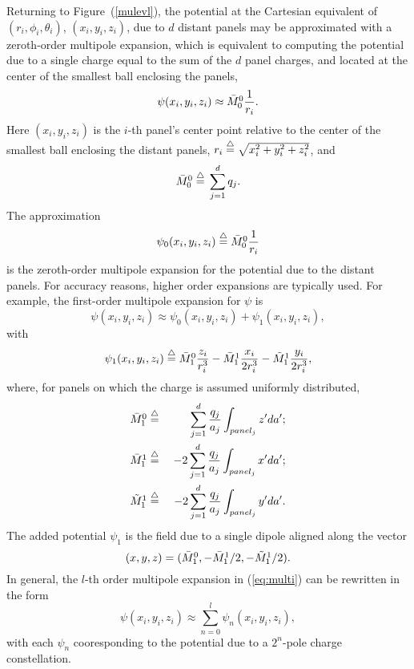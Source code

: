 Returning to Figure~(\ref{mulevl}), the potential at the Cartesian
equivalent of $(r_i,\phi_i,\theta_i)$, $(x_i, y_i, z_i)$, due to $d$
distant panels may be approximated with a zeroth-order multipole
expansion, which is equivalent to computing the potential due to a
single charge equal to the sum of the $ d $ panel charges, and located
at the center of the smallest ball enclosing the panels,
\begin{equation}
\psi(x_i,y_i,z_i)\approx\mbox{$\bar{M}_{0}^{0}$}\frac{1}{r_i}.
\label{mulex0}
\end{equation}
Here $(x_i,y_i,z_i)$ is the $i$-th panel's center point relative to the
center of the smallest ball enclosing the distant panels, 
$r_i\mbox{$\;\stackrel{\triangle}{=}\;$}\sqrt{x_i^2+y_i^2+z_i^2}$, and
\begin{equation}
\mbox{$\bar{M}_{0}^{0}$}\mbox{$\;\stackrel{\triangle}{=}\;$} \sum_{j=1}^{d} q_j.
\end{equation}
The approximation
\begin{equation}
\psi_0(x_i,y_i,z_i)\mbox{$\;\stackrel{\triangle}{=}\;$} \mbox{$\bar{M}_{0}^{0}$}\frac{1}{r_i}
\end{equation}
is the zeroth-order multipole expansion for the potential due to the
distant panels.
For accuracy reasons, higher order expansions are typically used.
For example, the first-order multipole expansion for $\psi$ is
\begin{equation}
\psi(x_i,y_i,z_i)\approx\psi_0(x_i,y_i,z_i)+\psi_1(x_i,y_i,z_i),
\end{equation}
with
\begin{equation}
\psi_1(x_i,y_i,z_i)\mbox{$\;\stackrel{\triangle}{=}\;$}\mbox{$\bar{M}_{1}^{0}$}\frac{z_i}{r_i^3}-\mbox{$\bar{M}_{1}^{1}$}\frac{x_i}{2r_i^3}-\mbox{$\tilde{M}_{1}^{1}$}\frac{y_i}{2r_i^3},
\label{fstotr}
\end{equation}
where, for panels on which the charge is assumed uniformly distributed,
\begin{eqnarray}
\mbox{$\bar{M}_{1}^{0}$}&\mbox{$\;\stackrel{\triangle}{=}\;$} &\sum_{j=1}^{d}\frac{q_j}{a_j}\int_{panel_j}z' da';
\label{moco1}\\
\mbox{$\bar{M}_{1}^{1}$}& \mbox{$\;\stackrel{\triangle}{=}\;$} & -2\sum_{j=1}^{d}\frac{q_j}{a_j}\int_{panel_j}x' da';\\
\mbox{$\tilde{M}_{1}^{1}$}& \mbox{$\;\stackrel{\triangle}{=}\;$} & -2\sum_{j=1}^{d}\frac{q_j}{a_j}\int_{panel_j}y' da'.
\label{moco2}
\end{eqnarray}
The added potential $\psi_1$
is the field due to a single dipole aligned along the vector
\begin{equation}
(x,y,z) = (\mbox{$\bar{M}_{1}^{0}$}, -\mbox{$\bar{M}_{1}^{1}$}/2, -\mbox{$\tilde{M}_{1}^{1}$}/2).
\end{equation}
In general, the $l$-th order multipole expansion in (\ref{eq:multi}) can
be rewritten in the form
\begin{equation}
\psi(x_i,y_i,z_i)\approx\sum_{n=0}^l\psi_n(x_i,y_i,z_i),
\label{mueval}
\end{equation}
with each $\psi_n$ cooresponding to the potential due to
a $2^n$-pole charge constellation.

